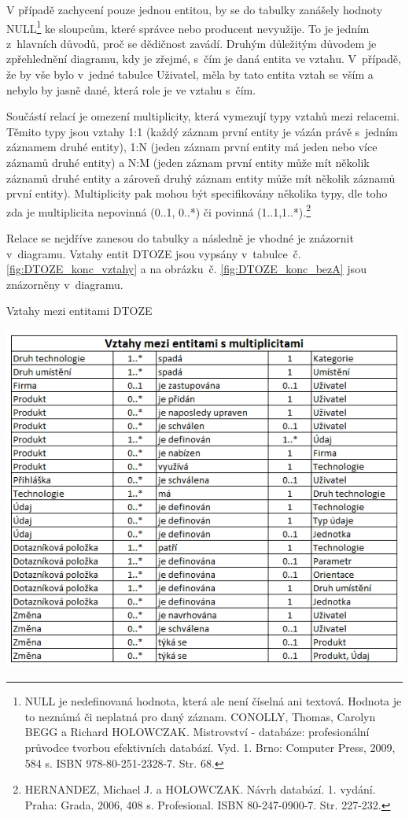 \documentclass[11pt,a4paper]{article}
\begin{document}
V případě zachycení pouze jednou entitou, by se do tabulky zanášely hodnoty NULL\footnote{NULL je nedefinovaná hodnota, která ale není číselná ani textová. Hodnota je to neznámá či neplatná pro daný záznam. CONOLLY, Thomas, Carolyn BEGG a Richard HOLOWCZAK. Mistrovství - databáze: profesionální průvodce tvorbou efektivních databází. Vyd. 1. Brno: Computer Press, 2009, 584 s. ISBN 978-80-251-2328-7. Str. 68.} ke sloupcům, které správce nebo producent nevyužije. To je jedním z~hlavních důvodů, proč se dědičnost zavádí. Druhým důležitým důvodem je zpřehlednění diagramu, kdy je zřejmé, s~čím je daná entita ve vztahu. V~případě, že by vše bylo v~jedné tabulce Uživatel, měla by tato entita vztah se vším a nebylo by jasně dané, která role je ve vztahu s~čím. 

Součástí relací je omezení multiplicity, která vymezují typy vztahů mezi relacemi. Těmito typy jsou vztahy 1:1 (každý záznam první entity je vázán právě s~jedním záznamem druhé entity), 1:N (jeden záznam první entity má jeden nebo více záznamů druhé entity) a N:M (jeden záznam první entity může mít několik záznamů druhé entity a zároveň druhý záznam entity může mít několik záznamů první entity). Multiplicity pak mohou být specifikovány několika typy, dle toho zda je multiplicita nepovinná (0..1, 0..*) či povinná (1..1,1..*).\footnote{HERNANDEZ, Michael J. a HOLOWCZAK. Návrh databází. 1. vydání. Praha: Grada, 2006, 408 s. Profesional. ISBN 80-247-0900-7. Str. 227-232.}

Relace se nejdříve zanesou do tabulky a následně je vhodné je znázornit v~diagramu. Vztahy entit DTOZE jsou vypsány v~tabulce~č. \ref{fig:DTOZE_konc_vztahy} a na obrázku~č. \ref{fig:DTOZE_konc_bezA} jsou znázorněny v~diagramu.

\begin{table}[H] 
\centering 
\caption{Vztahy mezi entitami DTOZE} 
\includegraphics[scale=0.55]{DTOZE_konc_vztahy}
\label{fig:DTOZE_konc_vztahy} 
\end{table} 
\end{document}
